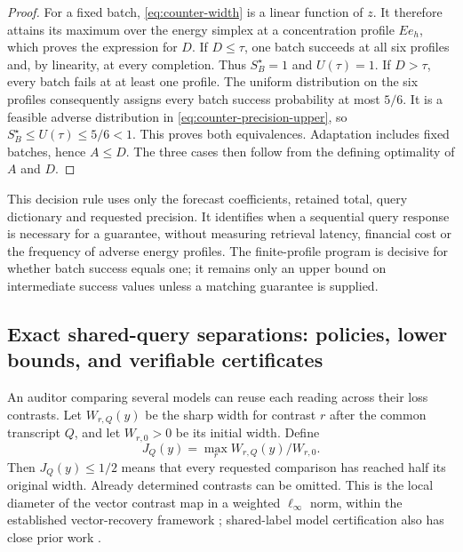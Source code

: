 \documentclass[12pt]{article}
\begin{document}
\begin{proof}
For a fixed batch, \eqref{eq:counter-width} is a linear function of
$z$. It therefore attains its maximum over the energy simplex at a
concentration profile $Ee_h$, which proves the expression for $D$.
If $D\leq\tau$, one batch succeeds at all six profiles and, by
linearity, at every completion. Thus $S_B^\star=1$ and $U(\tau)=1$.
If $D>\tau$, every batch fails at at least one profile. The uniform
distribution on the six profiles consequently assigns every batch
success probability at most $5/6$. It is a feasible adverse distribution
in \eqref{eq:counter-precision-upper}, so
$S_B^\star\leq U(\tau)\leq5/6<1$. This proves both equivalences.
Adaptation includes fixed batches, hence $A\leq D$. The three cases
then follow from the defining optimality of $A$ and $D$.
\end{proof}

This decision rule uses only the forecast coefficients, retained total,
query dictionary and requested precision. It identifies when a sequential
query response is necessary for a guarantee, without measuring retrieval
latency, financial cost or the frequency of adverse energy profiles.
The finite-profile program is decisive for whether batch success equals
one; it remains only an upper bound on intermediate success values unless
a matching guarantee is supplied.
\subsection{Exact shared-query separations: policies, lower bounds, and verifiable certificates}
\label{sec:joint-separations}
An auditor comparing several models can reuse each reading across their
loss contrasts. Let $W_{r,Q}(y)$ be the sharp width for contrast $r$ after
the common transcript $Q$, and let $W_{r,0}>0$ be its initial width. Define
\[
 J_Q(y)=\max_r W_{r,Q}(y)/W_{r,0}.
\]
Then $J_Q(y)\leq1/2$ means that every requested comparison has reached
half its original width. Already determined contrasts can be omitted.
This is the local diameter of the vector contrast map in a weighted
$\ell_\infty$ norm, within the established vector-recovery framework
\citep{krieg2025}; shared-label model certification also has close prior
work \citep{kuboyama2026}.
\end{document}
